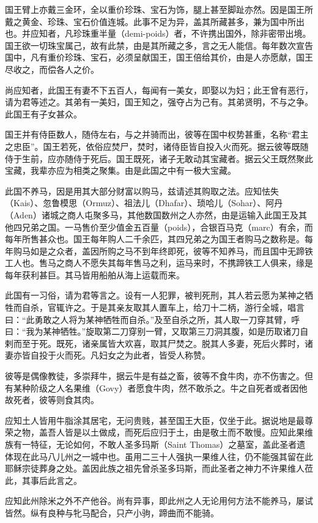 \documentclass[12pt,UTF8]{ctexbook}
\begin{document}
国王臂上亦戴三金环，全以重价珍珠、宝石为饰，腿上甚至脚趾亦然。因是国王所戴之黄金、珍珠、宝石价值连城。此事不足为异，盖其所藏甚多，兼为国中所出也。并应知者，凡珍珠重半量（demi-poids）者，不许携出国外，除非密带出境。国王欲一切珠宝属己，故有此禁，由是其所藏之多，言之无人能信。每年数次宣告国中，凡有重价珍珠、宝石，必须呈献国王，国王倍给其价，由是人亦愿献，国王尽收之，而偿各人之价。

尚应知者，此国王有妻不下五百人，每闻有一美女，即娶以为妇；此王曾有恶行，请为君等述之。其弟有一美妇，国王知之，强夺占为己有。其弟贤明，不与之争。此国王有子女甚众。

国王并有侍臣数人，随侍左右，与之并骑而出，彼等在国中权势甚重，名称“君主之忠臣”。国王若死，依俗应焚尸，焚时，诸侍臣皆自投入火而死。据云彼等既随侍于生前，应亦随侍于死后。国王既死，诸子无敢动其宝藏者。据云父王既然聚此宝藏，我辈亦应为相类之聚集。由是此国之中有一极大宝藏。

此国不养马，因是用其大部分财富以购马，兹请述其购取之法。应知怯失（Kais）、忽鲁模思（Ormuz）、祖法儿（Dhafar）、琐哈儿（Sohar）、阿丹（Aden）诸城之商人屯聚多马，其他数国数州之人亦然，由是运输入此国王及其他四兄弟之国。一马售价至少值金五百量（poids），合银百马克（marc）有余，而每年所售甚众也。国王每年购人二千余匹，其四兄弟之为国王者购马之数称是。每年购马如是之众者，盖因所购之马不到年终即死，彼等不知养马，而且国中无蹄铁工人也。售马之商人不愿失其每年售马之利，运马来时，不携蹄铁工人俱来，缘是每年获利甚巨。其马皆用船舶从海上运载而来。

此国有一习俗，请为君等言之。设有一人犯罪，被判死刑，其人若云愿为某神之牺牲而自杀，官辄许之。于是其亲友取其人置车上，给刀十二柄，游行全城，唱言曰：“此勇敢之人将为某神牺牲而自杀。”及至自杀之所，其人取一刀穿其臂，呼曰：“我为某神牺牲。”旋取第二刀穿别一臂，又取第三刀洞其腹，如是历取诸刀自剌而至于死。既死，诸亲属皆大欢喜，取其尸焚之。脱其人多妻，死后火葬时，诸妻亦皆自投于火而死。凡妇女之为此者，皆受人称赞。

彼等是偶像教徒，多崇拜牛，据云牛是有益之畜，彼等不食牛肉，亦不伤害之。但有某种阶级之人名果维（Govy）者愿食牛肉，然不敢杀之。牛之自死者或者因他故死者，彼等则食其肉。

应知土人皆用牛脂涂其居宅，无问贵贱，甚至国王大臣，仅坐于此。据说地是最尊荣之物，盖吾人皆是以土做成，而死后应归于土，由是敬土而不敢慢。应知此果维族有一特征，无论如何，不敢人圣多玛斯（Saint Thomas）之墓室，盖此圣者遗体现在此马八儿州之一城中也。虽用二三十人强执一果维人往，仍不能强其留在此耶稣宗徒葬身之处。盖因此族之祖先曾杀圣多玛斯，而此圣者之神力不许果维人莅此，其事后此言之。

应知此州除米之外不产他谷。尚有异事，即此州之人无论用何方法不能养马，屡试皆然。纵有良种与牝马配合，只产小驹，蹄曲而不能骑。
\end{document}
